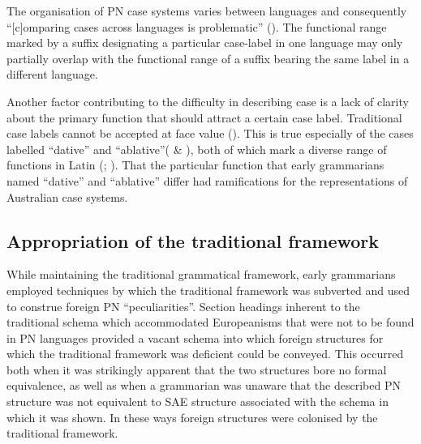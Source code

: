 The organisation of PN case systems varies between languages and consequently “[c]omparing cases across languages is problematic” (\citealt[155]{blake_case_2001}). The functional range marked by a suffix designating a particular case-label in one language may only partially overlap with the functional range of a suffix bearing the same label in a different language. 

Another factor contributing to the difficulty in describing case is a lack of clarity about the primary function that should attract a certain case label. Traditional case labels cannot be accepted at face value (\citealt[155]{blake_case_2001}). This is true especially of the cases labelled “dative” and “ablative”( \& ), both of which mark a diverse range of functions in Latin (\citealt[218--230, 246--265]{gildersleeve_latin_1895}; \citealt[157--162]{blake_1994}). That the particular function that early grammarians named “dative” and “ablative” differ had ramifications for the representations of Australian case systems.

\subsection{Appropriation of the traditional framework}
\label{sec:key:2.3.3}

While maintaining the traditional grammatical framework, early grammarians employed techniques by which the traditional framework was subverted and used to construe foreign PN “peculiarities''. Section headings inherent to the traditional schema which accommodated Europeanisms that were not to be found in PN languages provided a vacant schema into which foreign structures for which the traditional framework was deficient could be conveyed. This occurred both when it was strikingly apparent that the two structures bore no formal equivalence, as well as when a grammarian was unaware that the described PN structure was not equivalent to SAE structure associated with the schema in which it was shown. In these ways foreign structures were colonised by the traditional framework.

